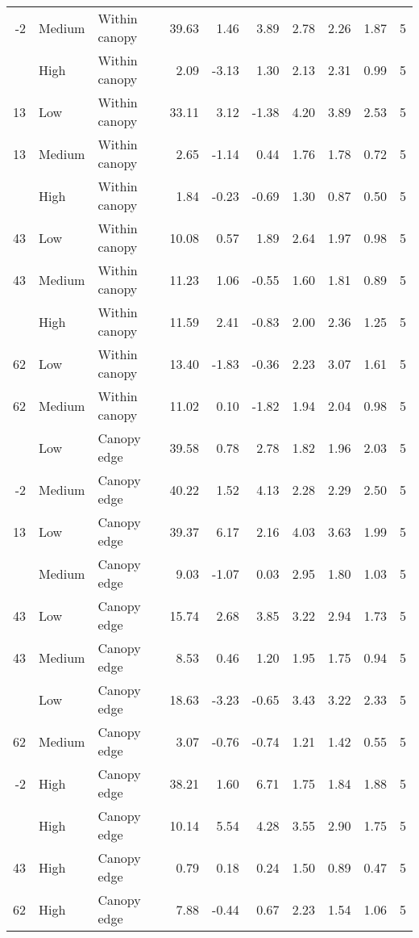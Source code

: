 \documentclass[10pt,]{article}
\begin{document}
\begin{longtable}{rllrrrrrrr}
-2 & Medium & Within canopy & 39.63 & 1.46 & 3.89 & 2.78 & 2.26 & 1.87 & 5\\
\addlinespace
13 & High & Within canopy & 2.09 & -3.13 & 1.30 & 2.13 & 2.31 & 0.99 & 5\\
13 & Low & Within canopy & 33.11 & 3.12 & -1.38 & 4.20 & 3.89 & 2.53 & 5\\
13 & Medium & Within canopy & 2.65 & -1.14 & 0.44 & 1.76 & 1.78 & 0.72 & 5\\
\addlinespace
43 & High & Within canopy & 1.84 & -0.23 & -0.69 & 1.30 & 0.87 & 0.50 & 5\\
43 & Low & Within canopy & 10.08 & 0.57 & 1.89 & 2.64 & 1.97 & 0.98 & 5\\
43 & Medium & Within canopy & 11.23 & 1.06 & -0.55 & 1.60 & 1.81 & 0.89 & 5\\
\addlinespace
62 & High & Within canopy & 11.59 & 2.41 & -0.83 & 2.00 & 2.36 & 1.25 & 5\\
62 & Low & Within canopy & 13.40 & -1.83 & -0.36 & 2.23 & 3.07 & 1.61 & 5\\
62 & Medium & Within canopy & 11.02 & 0.10 & -1.82 & 1.94 & 2.04 & 0.98 & 5\\
\addlinespace
-2 & Low & Canopy edge & 39.58 & 0.78 & 2.78 & 1.82 & 1.96 & 2.03 & 5\\
-2 & Medium & Canopy edge & 40.22 & 1.52 & 4.13 & 2.28 & 2.29 & 2.50 & 5\\
13 & Low & Canopy edge & 39.37 & 6.17 & 2.16 & 4.03 & 3.63 & 1.99 & 5\\
\addlinespace
13 & Medium & Canopy edge & 9.03 & -1.07 & 0.03 & 2.95 & 1.80 & 1.03 & 5\\
43 & Low & Canopy edge & 15.74 & 2.68 & 3.85 & 3.22 & 2.94 & 1.73 & 5\\
43 & Medium & Canopy edge & 8.53 & 0.46 & 1.20 & 1.95 & 1.75 & 0.94 & 5\\
\addlinespace
62 & Low & Canopy edge & 18.63 & -3.23 & -0.65 & 3.43 & 3.22 & 2.33 & 5\\
62 & Medium & Canopy edge & 3.07 & -0.76 & -0.74 & 1.21 & 1.42 & 0.55 & 5\\
-2 & High & Canopy edge & 38.21 & 1.60 & 6.71 & 1.75 & 1.84 & 1.88 & 5\\
\addlinespace
13 & High & Canopy edge & 10.14 & 5.54 & 4.28 & 3.55 & 2.90 & 1.75 & 5\\
43 & High & Canopy edge & 0.79 & 0.18 & 0.24 & 1.50 & 0.89 & 0.47 & 5\\
62 & High & Canopy edge & 7.88 & -0.44 & 0.67 & 2.23 & 1.54 & 1.06 & 5\\*
\end{longtable}\endgroup{}
\end{document}
